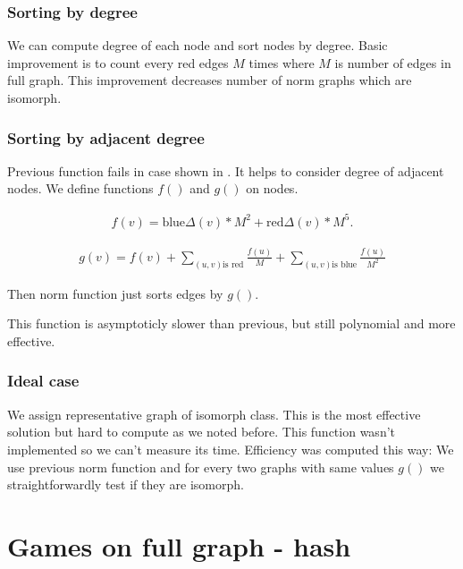 \subsubsection{Sorting by degree}
We can compute degree of each node and sort nodes by degree. Basic improvement
is to count every red edges $M$ times where $M$ is number of edges in full
graph. This improvement decreases number of norm graphs which are isomorph.

\subsubsection{Sorting by adjacent degree} Previous function fails in case shown
in . It helps to consider
degree of adjacent nodes. We define functions $f()$ and $g()$ on nodes. 

\begin{eqnarray*} 
f(v) = \mbox{blue}\Delta (v) * M^2 + \mbox{red}\Delta (v) * M^5.
\end{eqnarray*}

\begin{eqnarray*} 
g(v) = f(v) + \sum_{(u,v) \mbox{is red}}{\frac{f(u)}{M}} + \sum_{(u,v) \mbox{is blue}}{\frac{f(u)}{M^2}}
\end{eqnarray*}

Then norm function just sorts edges by $g()$.

This function is asymptoticly slower than previous, but still polynomial
and more effective.

\subsubsection{Ideal case} 
We assign representative graph of isomorph class.
This is the most effective solution but hard to compute as we noted before.
This function wasn't implemented so we can't measure its time.
Efficiency was computed this way: We use previous norm function
and for every two graphs with same values $g()$ we straightforwardly test 
if they are isomorph. 

\section{ Games on full graph - hash } 




